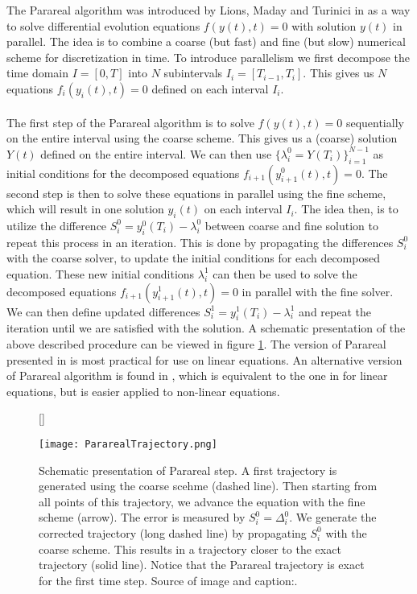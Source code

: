The Parareal algorithm was introduced by Lions, Maday and Turinici in \cite{lions2001resolution} as a way to solve differential evolution equations $f(y(t),t)=0$ with solution $y(t)$ in parallel. The idea is to combine a coarse (but fast) and fine (but slow) numerical scheme for discretization in time. To introduce parallelism we first decompose the time domain $I=[0,T]$ into $N$ subintervals $I_i=[T_{i-1},T_i]$. This gives us $N$ equations $f_i(y_i(t),t)=0$ defined on each interval $I_i$. 
\\
\\
The first step of the Parareal algorithm is to solve $f(y(t),t)=0$ sequentially on the entire interval using the coarse scheme. This gives us a (coarse) solution $Y(t)$ defined on the entire interval. We can then use $\{\lambda_i^0=Y(T_i)\}_{i=1}^{N-1}$ as initial conditions for the decomposed equations $f_{i+1}(y_{i+1}^0(t),t)=0$. The second step is then to solve these equations in parallel using the fine scheme, which will result in one solution $y_i(t)$ on each interval $I_i$. The idea then, is to utilize the difference $S_i^0=y_i^0(T_{i})-\lambda_i^0$ between coarse and fine solution to repeat this process in an iteration. This is done by propagating the differences $S_i^0$ with the coarse solver, to update the initial conditions for each decomposed equation. These new initial conditions $\lambda_i^1$ can then be used to solve the decomposed equations $f_{i+1}(y_{i+1}^1(t),t)=0$ in parallel with the fine solver. We can then define updated differences $S_i^1=y_i^1(T_{i})-\lambda_i^1$ and repeat the iteration until we are satisfied with the solution. A schematic presentation of the above described procedure can be viewed in figure \ref{trajectory_fig}. The version of Parareal presented in \cite{lions2001resolution} is most practical for use on linear equations. An alternative version of Parareal algorithm is found in \cite{baffico2002parallel}, which is equivalent to the one in \cite{lions2001resolution} for linear equations, but is easier applied to non-linear equations.
\\
\begin{figure}[h!]
[\FBwidth]
{\caption{Schematic presentation of Parareal step. A first trajectory is generated using the coarse scehme (dashed line). Then starting from all points of this trajectory, we advance the equation with the fine scheme (arrow). The error is measured by $S^0_i=\Delta^0_i$. We generate the corrected trajectory (long dashed line) by propagating $S^0_i$ with the coarse scheme. This results in a trajectory closer to the exact trajectory (solid line). Notice that the Parareal trajectory is exact for the first time step. Source of image and caption:\cite{baffico2002parallel}.}\label{trajectory_fig}}
{\texttt{[image: PararealTrajectory.png]}}
\end{figure}
